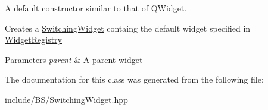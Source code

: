 A default constructor similar to that of Q\+Widget. 

Creates a \hyperlink{class_switching_widget}{Switching\+Widget} containg the default widget specified in \hyperlink{class_widget_registry}{Widget\+Registry} 
\begin{DoxyParams}{Parameters}
{\em parent} & A parent widget \\
\hline
\end{DoxyParams}


The documentation for this class was generated from the following file\+:\begin{DoxyCompactItemize}
\item 
include/\+B\+S/Switching\+Widget.\+hpp\end{DoxyCompactItemize}
